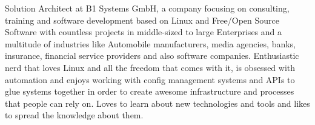 

\begin{cvparagraph}

Solution Architect at B1 Systems GmbH, a company focusing on consulting, training and
software development based on Linux and Free/Open Source Software with countless projects in
middle-sized to large Enterprises and a multitude of industries like Automobile manufacturers, media
agencies, banks, insurance, financial service providers and also software companies. Enthusiastic
nerd that loves Linux and all the freedom that comes with it, is obsessed with automation and enjoys
working with config management systems and APIs to glue systems together in order to create awesome
infrastructure and processes that people can rely on. Loves to learn about new technologies and
tools and likes to spread the knowledge about them.
\end{cvparagraph}
